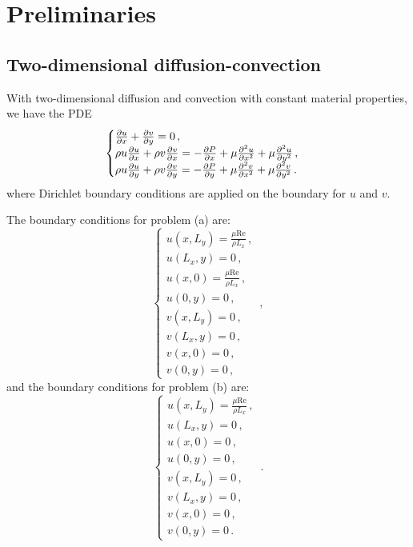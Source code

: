 \documentclass{article}
\begin{document}
\section{Preliminaries}

\subsection{Two-dimensional diffusion-convection}

With two-dimensional diffusion and convection with constant material properties, we have the PDE
\begin{equation}
	\begin{cases}
		\pdv{u}{x} + \pdv{v}{y} = 0\,,\\
		\rho u \pdv{u}{x} + \rho v \pdv{v}{x} = - \pdv{P}{x} + \mu \pdv{^2u}{x^2} + \mu \pdv{^2u}{y^2}\,,\\
		\rho u \pdv{u}{y} + \rho v \pdv{v}{y} = - \pdv{P}{y} + \mu \pdv{^2v}{x^2} + \mu \pdv{^2v}{y^2}\,.
	\end{cases}
\end{equation}
where Dirichlet boundary conditions are applied on the boundary for $u$ and $v$.

The boundary conditions for problem (a) are:
\begin{equation}
	\begin{cases}
		u(x, L_y) = \frac{\mu \text{Re}}{\rho L_x}\,, \\
		u(L_x, y) = 0 \,, \\
		u(x, 0) = \frac{\mu \text{Re}}{\rho L_x} \,, \\
		u(0, y) = 0 \,, \\
		v(x, L_y) = 0\,, \\
		v(L_x, y) = 0 \,, \\
		v(x, 0) = 0\,, \\
		v(0, y) = 0 \,,
	\end{cases}\,,
\end{equation}
and the boundary conditions for problem (b) are:
\begin{equation}
	\begin{cases}
		u(x, L_y) = \frac{\mu \text{Re}}{\rho L_x}\,, \\
		u(L_x, y) = 0 \,, \\
		u(x, 0) = 0 \,, \\
		u(0, y) = 0 \,, \\
		v(x, L_y) = 0\,, \\
		v(L_x, y) = 0 \,, \\
		v(x, 0) = 0\,, \\
		v(0, y) = 0 \,.
	\end{cases}\,.
\end{equation}
\end{document}
